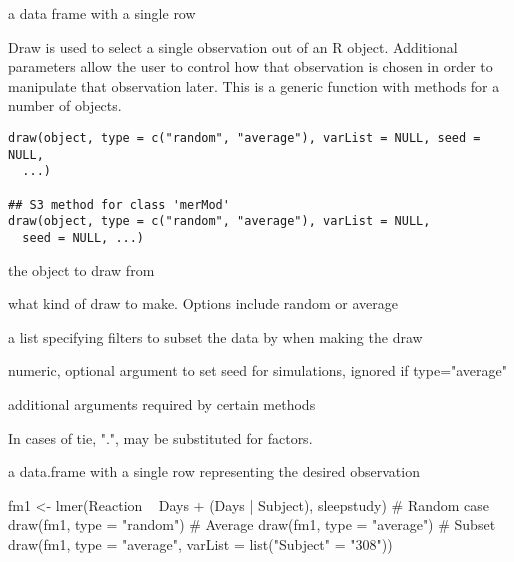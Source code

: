 \documentclass[letterpaper]{book}
\begin{document}
%
\begin{Value}
a data frame with a single row
\end{Value}
%
\begin{Description}\relax
Draw is used to select a single observation out of an R object.
Additional parameters allow the user to control how that observation is
chosen in order to manipulate that observation later. This is a generic
function with methods for a number of objects.
\end{Description}
%
\begin{Usage}
\begin{verbatim}
draw(object, type = c("random", "average"), varList = NULL, seed = NULL,
  ...)

## S3 method for class 'merMod'
draw(object, type = c("random", "average"), varList = NULL,
  seed = NULL, ...)
\end{verbatim}
\end{Usage}
%
\begin{Arguments}
\begin{ldescription}
\item[\code{object}] the object to draw from

\item[\code{type}] what kind of draw to make. Options include random or average

\item[\code{varList}] a list specifying filters to subset the data by when making the
draw

\item[\code{seed}] numeric, optional argument to set seed for simulations, ignored if type="average"

\item[\code{...}] additional arguments required by certain methods
\end{ldescription}
\end{Arguments}
%
\begin{Details}\relax
In cases of tie, ".", may be substituted for factors.
\end{Details}
%
\begin{Value}
a data.frame with a single row representing the desired observation
\end{Value}
%
\begin{Examples}
\begin{ExampleCode}
fm1 <- lmer(Reaction ~ Days + (Days | Subject), sleepstudy)
# Random case
draw(fm1, type = "random")
# Average
draw(fm1, type = "average")
# Subset
draw(fm1, type = "average", varList = list("Subject" = "308"))

\end{ExampleCode}
\end{Examples}
\end{document}
